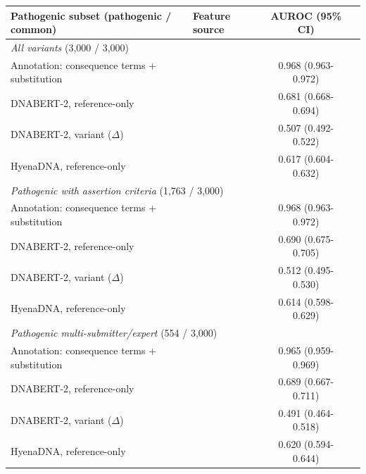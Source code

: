 \begin{tabular}{llcc}\toprule
Pathogenic subset (pathogenic / common) & Feature source & AUROC (95\% CI)\\\midrule
\multicolumn{3}{l}{\emph{All variants} (3,000 / 3,000)}\\
\quad Annotation: consequence terms + substitution & & 0.968 (0.963-0.972)\\
\quad DNABERT-2, reference-only & & 0.681 (0.668-0.694)\\
\quad DNABERT-2, variant ($\Delta$) & & 0.507 (0.492-0.522)\\
\quad HyenaDNA, reference-only & & 0.617 (0.604-0.632)\\
\multicolumn{3}{l}{\emph{Pathogenic with assertion criteria} (1,763 / 3,000)}\\
\quad Annotation: consequence terms + substitution & & 0.968 (0.963-0.972)\\
\quad DNABERT-2, reference-only & & 0.690 (0.675-0.705)\\
\quad DNABERT-2, variant ($\Delta$) & & 0.512 (0.495-0.530)\\
\quad HyenaDNA, reference-only & & 0.614 (0.598-0.629)\\
\multicolumn{3}{l}{\emph{Pathogenic multi-submitter/expert} (554 / 3,000)}\\
\quad Annotation: consequence terms + substitution & & 0.965 (0.959-0.969)\\
\quad DNABERT-2, reference-only & & 0.689 (0.667-0.711)\\
\quad DNABERT-2, variant ($\Delta$) & & 0.491 (0.464-0.518)\\
\quad HyenaDNA, reference-only & & 0.620 (0.594-0.644)\\
\bottomrule\end{tabular}
